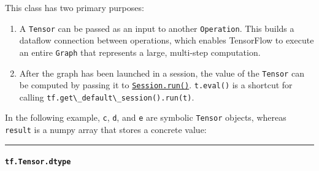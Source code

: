 This class has two primary purposes:

\begin{enumerate}
\def\labelenumi{\arabic{enumi}.}
\item
  A \lstinline{Tensor} can be passed as an input to another
  \lstinline{Operation}. This builds a dataflow connection between
  operations, which enables TensorFlow to execute an entire
  \lstinline{Graph} that represents a large, multi-step computation.
\item
  After the graph has been launched in a session, the value of the
  \lstinline{Tensor} can be computed by passing it to
  \href{../../api_docs/python/client.md\#Session.run}{\lstinline{Session.run()}}.
  \lstinline{t.eval()} is a shortcut for calling
  \lstinline{tf.get\_default\_session().run(t)}.
\end{enumerate}

In the following example, \lstinline{c}, \lstinline{d}, and \lstinline{e} are
symbolic \lstinline{Tensor} objects, whereas \lstinline{result} is a numpy
array that stores a concrete value:

\begin{Shaded}
\begin{Highlighting}[]
\OperatorTok{=} \NormalTok{tf.constant([[}\NormalTok{, }\NormalTok{], [}\NormalTok{, }\NormalTok{]])}
\OperatorTok{=} \NormalTok{tf.constant([[}\NormalTok{, }\NormalTok{], [}\NormalTok{, }\NormalTok{]])}
\OperatorTok{=} 

\OperatorTok{=} 

\OperatorTok{=} 
\end{Highlighting}
\end{Shaded}

\begin{center}\rule{0.5\linewidth}{\linethickness}\end{center}

\paragraph{\texorpdfstring{\lstinline{tf.Tensor.dtype}
}{tf.Tensor.dtype }}\label{tf.tensor.dtype}

